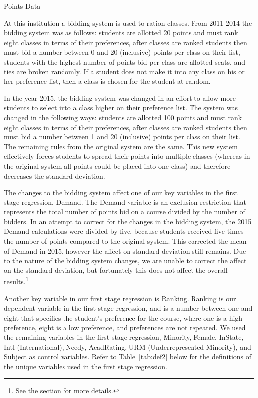 \documentclass[12pt,a4paper,english,fleqn]{article}
\makeatletter
\newcommand{\tablelabel}[1]{Table~\ref{#1}}
\renewcommand\subsection{\@startsection{subsection}{2}
{\z@}{-3.25ex\@plus -1ex \@minus -.2ex}{1.5ex \@plus .2ex}{\normalfont\bf}}
\makeatother
\begin{document}
\clearpage{}

\subsection{Points Data}\label{pointsdata}

At this institution a bidding system is used to ration classes. 
From 2011-2014 the bidding system was as follows: 
students are allotted 20 points and must rank eight classes in terms of their preferences, 
after classes are ranked students then must bid a number between 0 and 20 (inclusive) points per class on their list, 
students with the highest number of points bid per class are allotted seats, and ties are broken randomly. 
If a student does not make it into any class on his or her preference list, then a class is chosen for the student at random. 

In the year 2015, the bidding system was changed in an effort to allow more students to select into a class higher on their preference list. 
The system was changed in the following ways:
students are allotted 100 points and must rank eight classes in terms of their preferences,
after classes are ranked students then must bid a number between 1 and 20 (inclusive) points per class on their list.
The remaining rules from the original system are the same. 
This new system effectively forces students to spread their points into multiple classes (whereas in the original system all points could be placed into one class) and therefore decreases the standard deviation.

The changes to the bidding system affect one of our key variables in the first stage regression, Demand. 
The Demand variable is an exclusion restriction that represents the total number of points bid on a course divided by the number of bidders. 
In an attempt to correct for the changes in the bidding system, the 2015 Demand calculations were divided by five, because students received five times the number of points compared to the original system. 
This corrected the mean of Demand in 2015, however the affect on standard deviation still remains. 
Due to the nature of the bidding system changes, we are unable to correct the affect on the standard deviation, but fortunately this does not affect the overall results.\footnote{See the  section for more details.} 

Another key variable in our first stage regression is Ranking. 
Ranking is our dependent variable in the first stage regression, and is a number between one and eight that specifies the student's preference for the course, where one is a high preference, eight is a low preference, and preferences are not repeated. 
We used the remaining variables in the first stage regression, Minority, Female, InState, Intl (International), Needy, AcadRating, URM (Underrepresented Minority), and Subject as control variables. Refer to \tablelabel{tab:def2} below for the definitions of the unique variables used in the first stage regression. 
\end{document}
